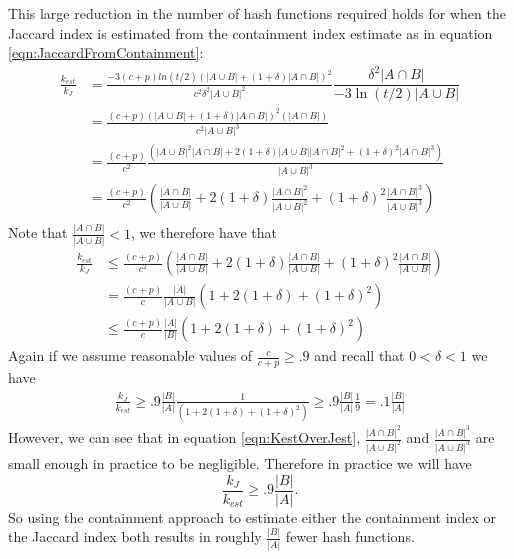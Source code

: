 \documentclass[11pt]{amsart}
\theoremstyle{remark}
\numberwithin{equation}{section}
\begin{document}
This large reduction in the number of hash functions required holds for when the Jaccard index is estimated from the containment index estimate as in equation \eqref{eqn:JaccardFromContainment}:
\begin{align}
\frac{k_{est}}{k_J} &=\frac{-3(c+p)ln(t/2)\left(|A\cup B|+(1+\delta)|A\cap B|\right)^2}{c^2\delta^2|A\cup B|^2 }
\dfrac{\delta^2 |A\cap B|}{-3\ln(t/2)|A\cup B|}\\
&= \frac{(c+p)\left(|A\cup B|+(1+\delta)|A\cap B|\right)^2(|A\cap B|)}{c^2|A\cup B|^3}\\
& =\frac{(c+p)}{c^2}\frac{(|A\cup B|^2|A\cap B|+2(1+\delta)|A\cup B||A\cap B|^2+(1+\delta)^2|A\cap B|^3)}{|A\cup B|^3}\\
&= \frac{(c+p)}{c^2}\left(\frac{|A\cap B|}{|A\cup B|}+2(1+\delta)\frac{|A\cap B|^2}{|A\cup B|^2}+(1+\delta)^2\frac{|A\cap B|^3}{|A\cup B|^3}\right) \label{eqn:KestOverJest}\\
\end{align}
Note that $\frac{|A\cap B|}{|A\cup B|} <1$, we therefore have that
\begin{align*}
\frac{k_{est}}{k_J} &\leq \frac{(c+p)}{c^2}\left(\frac{|A\cap B|}{|A\cup B|}+2(1+\delta)\frac{|A\cap B|}{|A\cup B|}+(1+\delta)^2\frac{|A\cap B|}{|A\cup B|}\right)\\
& = \frac{(c+p)}{c}\frac{|A|}{|A\cup B|}\left(1+2(1+\delta)+(1+\delta)^2\right)\\
&\leq \frac{(c+p)}{c}\frac{|A|}{|B|}\left(1+2(1+\delta)+(1+\delta)^2\right)
\end{align*}
Again if we assume reasonable values of $\frac{c}{c+p}\geq .9$ and recall that $0<\delta<1$ we have
\begin{align*}
\frac{k_J}{k_{est}}\geq .9\frac{|B|}{|A|}\frac{1}{\left(1+2(1+\delta)+(1+\delta)^2\right)}\geq .9\frac{|B|}{|A|}\frac{1}{9} = .1\frac{|B|}{|A|}
\end{align*}
However, we can see that in equation \eqref{eqn:KestOverJest}, $\frac{|A\cap B|^2}{|A\cup B|^2}$ and $\frac{|A\cap B|^3}{|A\cup B|^3}$ are small enough in practice to be negligible. Therefore in practice we will have 
 \begin{equation*}
\frac{k_J}{k_{est}}\geq .9\frac{|B|}{|A|}.
\end{equation*}
So using the containment approach to estimate either the containment index or the Jaccard index both results in roughly $\frac{|B|}{|A|}$ fewer hash functions.
\end{document}
